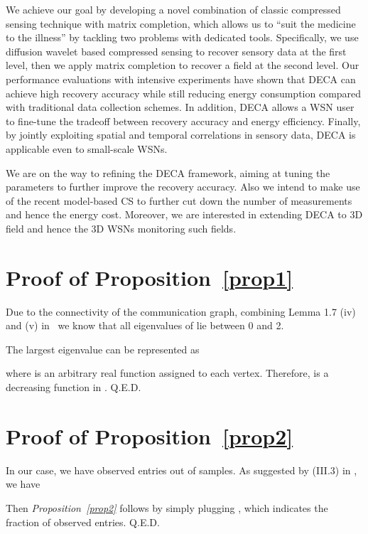 \documentclass[conference]{IEEEtran}
\begin{document}
  We achieve our goal by developing a novel combination of classic compressed sensing technique with matrix completion, which allows us to ``suit the medicine to the illness'' by tackling two problems with dedicated tools. Specifically, we use diffusion wavelet based compressed sensing to recover sensory data at the first level, then we apply matrix completion to recover a field at the second level. Our performance evaluations with intensive experiments have shown that DECA can achieve high recovery accuracy while still reducing energy consumption compared with traditional data collection schemes. In addition, DECA allows a WSN user to fine-tune the tradeoff between recovery accuracy and energy efficiency. Finally, by jointly exploiting spatial and temporal correlations in sensory data, DECA is applicable even to small-scale WSNs.

  We are on the way to refining the DECA framework, aiming at tuning the parameters to further improve the recovery accuracy. Also we intend to make use of the recent model-based CS to further cut down the number of measurements and hence the energy cost. Moreover, we are interested in extending DECA to 3D field and hence the 3D WSNs monitoring such fields.





\appendices
\section{Proof of Proposition~\ref{prop1}} \label{apx:prop1}

Due to the connectivity of the communication graph, combining Lemma 1.7 (iv) and (v) in~\cite{Chung97} we know that all eigenvalues of  lie between 0 and 2.

The largest eigenvalue can be represented as

where  is an arbitrary real function assigned to each vertex. Therefore,  is a decreasing function in . \hfill Q.E.D.

\section{Proof of Proposition~\ref{prop2}} \label{apx:prop2}

In our case, we have  observed entries out of  samples. As suggested by (III.3) in \cite{CandesP-ProcIEEE10}, we have

Then \textit{Proposition~\ref{prop2}} follows by simply plugging , which indicates the fraction of observed entries. \hfill Q.E.D.
\end{document}
